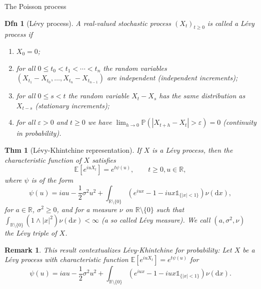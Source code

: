 \documentclass[a4paper]{article}
\theoremstyle{mytheoremstyle}
\newtheorem{definition}{Dfn}
\newtheorem{theorem}{Thm}
\newtheorem*{remark}{Remark}
\newcommand{\1}{\mathds{1}}
\begin{document}
\begin{multicols*}{3}
\begin{roundbox}{The Poisson process}
  \begin{definition}[L{\'e}vy process]
    A real-valued stochastic process $(X_t)_{t \geqslant 0}$ is called a
    {\emph{L{\'e}vy process}} if
    \begin{enumerate}
      \item $X_0 = 0$;

      \item for all $0 \leqslant t_0 < t_1 < \cdots < t_n$ the random variables
        $(X_{t_1} - X_{t_0}, \ldots, X_{t_n} - X_{t_{n - 1}})$ are independent
        ({\emph{independent increments}});

      \item for all $0 \leqslant s < t$ the random variable $X_t - X_s$ has the
        same distribution as $X_{t - s}$ ({\emph{stationary increments}});

      \item for all $\varepsilon > 0$ and $t \geqslant 0$ we have $\lim_{h
        \rightarrow 0} \mathbb{P} (| X_{t + h} - X_t | > \varepsilon) = 0$
        ({\emph{continuity in probability}}).
    \end{enumerate}
  \end{definition}

  \begin{theorem}[L{\'e}vy-Khintchine representation]
    If $X$ is a L{\'e}vy process, then the characteristic function of $X$
    satisfies
    \[ \mathbb{E} [e^{i u X_t}] = e^{t \psi (u)}, \qquad t \geqslant 0, u \in
    \mathbb{R}, \]
    where $\psi$ is of the form
    \[ \psi (u) = i a u - \frac{1}{2} \sigma^2 u^2 + \int_{\mathbb{R} \setminus
      \{ 0 \}} \left( e^{i u x} - 1 - i u x \1_{\{ | x | < 1 \}} \right) \nu
    (\mathrm{d} x), \]
    for $a \in \mathbb{R}$, $\sigma^2 \geqslant 0$, and for a measure $\nu$ on
    $\mathbb{R} \setminus \{ 0 \}$ such that $\int_{\mathbb{R} \setminus \{ 0
    \}} (1 \wedge | x |^2) \nu (\mathrm{d} x) < \infty$ (a so called
      {\emph{L{\'e}vy
    measure}}). We call $(a, \sigma^2, \nu)$ the {\emph{L{\'e}vy triple}} of
    $X$.
  \end{theorem}

  \begin{remark}
    This result contextualizes L{\'e}vy-Khintchine for probability:
    Let $X$ be a L{\'e}vy
    process with characteristic function $\mathbb{E} [e^{i u X_t}] =
    e^{t \psi (u)}$ for
    \[
      \psi (u) = i a u - \frac{1}{2} \sigma^2 u^2 + \int_{\mathbb{R} \setminus
      \{ 0 \}} \left( e^{i u x} - 1 - i u x \1_{\{ | x | < 1 \}} \right) \nu
      (\mathrm{d} x) .
    \]
  \end{remark}
\end{roundbox}


\end{multicols*}
\end{document}
